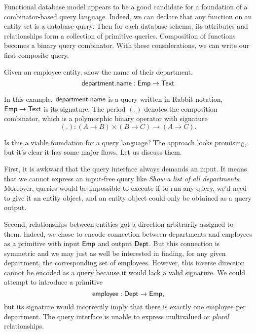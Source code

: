 Functional database model appears to be a good candidate for a foundation
of a combinator-based query language.  Indeed, we can declare that any
function on an entity set is a database query.  Then for each database schema,
its attributes and relationships form a collection of primitive queries.
Composition of functions becomes a binary query combinator.  With these
considerations, we can write our first composite query.

\begin{example}
    Given an employee entity, show the name of their department.
    \begin{equation*}
        \textup{\textsf{department}}{.}\textup{\textsf{name}}: \textup{\textsf{Emp}} \to \textup{\textsf{Text}}
    \end{equation*}
\end{example}

In this example, $\textup{\textsf{department}}{.}\textup{\textsf{name}}$ is a query written in Rabbit notation,
$\textup{\textsf{Emp}} \to \textup{\textsf{Text}}$ is its signature.  The period $({.})$ denotes the composition
combinator, which is a polymorphic binary operator with signature
\begin{equation*}
        ({.}) : (A \to B) \times (B \to C) \to (A \to C).
\end{equation*}

Is this a viable foundation for a query language?  The approach looks
promising, but it's clear it has some major flaws.  Let us discuss them.

First, it is awkward that the query interface always demands an input.  It
means that we cannot express an input-free query like \emph{Show a list of all
departments}.  Moreover, queries would be impossible to execute if to run any
query, we'd need to give it an entity object, and an entity object could only
be obtained as a query output.

Second, relationships between entities got a direction arbitrarily assigned to
them.  Indeed, we chose to encode connection between departments and employees
as a primitive with input $\textup{\textsf{Emp}}$ and output $\textup{\textsf{Dept}}$.  But this connection is
symmetric and we may just as well be interested in finding, for any given
department, the corresponding set of employees.  However, this inverse
direction cannot be encoded as a query because it would lack a valid signature.
We could attempt to introduce a primitive
\begin{equation*}
    \textup{\textsf{employee}}: \textup{\textsf{Dept}} \to \textup{\textsf{Emp}},
\end{equation*}
but its signature would incorrectly imply that there is exactly one employee
per department.  The query interface is unable to express multivalued or
\emph{plural} relationships.

